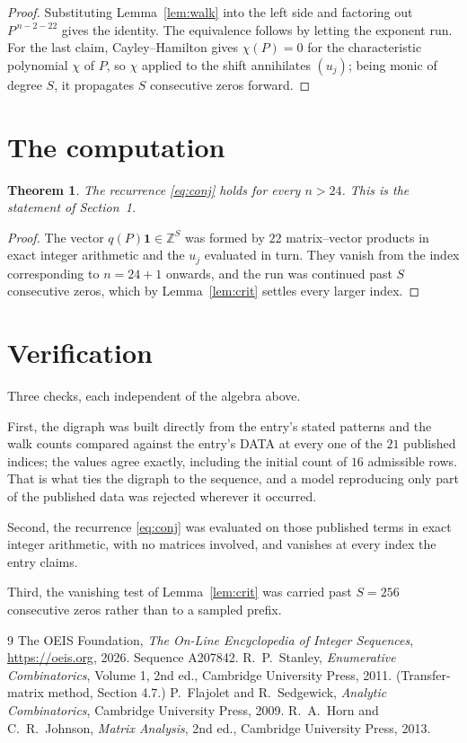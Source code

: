 \documentclass[11pt,a4paper]{article}
\theoremstyle{plain}
\newtheorem{theorem}{Theorem}
\theoremstyle{definition}
\begin{document}
\begin{proof}
Substituting Lemma~\ref{lem:walk} into the left side and factoring out
$P^{\,n-2-22}$ gives the identity. The equivalence follows by letting the exponent
run. For the last claim, Cayley--Hamilton gives $\chi(P)=0$ for the characteristic
polynomial $\chi$ of $P$, so $\chi$ applied to the shift annihilates $(u_j)$; being monic of
degree $S$, it propagates $S$ consecutive zeros forward.
\end{proof}

\section{The computation}

\begin{theorem}
The recurrence \eqref{eq:conj} holds for every $n>24$. This is the statement of
Section~1.
\end{theorem}

\begin{proof}
The vector $q(P)\mathbf{1}\in\mathbb{Z}^{S}$ was formed by $22$ matrix--vector
products in exact integer arithmetic and the $u_j$ evaluated in turn. They vanish from the
index corresponding to $n=24+1$ onwards, and the run was continued past $S$ consecutive
zeros, which by Lemma~\ref{lem:crit} settles every larger index.
\end{proof}

\section{Verification}

Three checks, each independent of the algebra above.

First, the digraph was built directly from the entry's stated patterns and the walk counts
compared against the entry's DATA at every one of the $21$ published indices; the
values agree exactly, including the initial count of $16$ admissible rows. That is
what ties the digraph to the sequence, and a model reproducing only part of the published
data was rejected wherever it occurred.

Second, the recurrence \eqref{eq:conj} was evaluated on those published terms in exact
integer arithmetic, with no matrices involved, and vanishes at every index the entry claims.

Third, the vanishing test of Lemma~\ref{lem:crit} was carried past $S=256$ consecutive
zeros rather than to a sampled prefix.

\begin{thebibliography}{9}
 The OEIS Foundation, \emph{The On-Line Encyclopedia of Integer
Sequences}, \url{https://oeis.org}, 2026. Sequence A207842.
 R.~P.~Stanley, \emph{Enumerative Combinatorics}, Volume 1, 2nd ed.,
Cambridge University Press, 2011. (Transfer-matrix method, Section 4.7.)
 P.~Flajolet and R.~Sedgewick, \emph{Analytic Combinatorics}, Cambridge
University Press, 2009.
 R.~A.~Horn and C.~R.~Johnson, \emph{Matrix Analysis}, 2nd ed., Cambridge
University Press, 2013.
\end{thebibliography}
\end{document}
